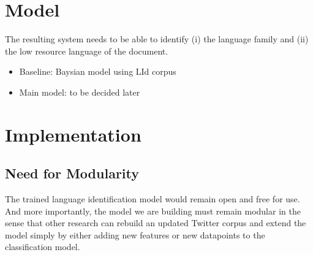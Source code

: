 \documentclass[11pt]{article}
\begin{document}
\section{Model}

The resulting system needs to be able to identify (i) the language family and (ii) the low resource language of the document.

\begin{itemize}
\item Baseline: Baysian model using LId corpus
\item Main model: to be decided later
\end{itemize}

\section{Implementation}

\subsection{Need for Modularity}

The trained language identification model would remain open and free for use. And more importantly, the model we are building must remain modular in the sense that other research can rebuild an updated Twitter corpus and extend the model simply by either adding new features or new datapoints to the classification model.



\
\\
\
\\

{}

\end{document}

